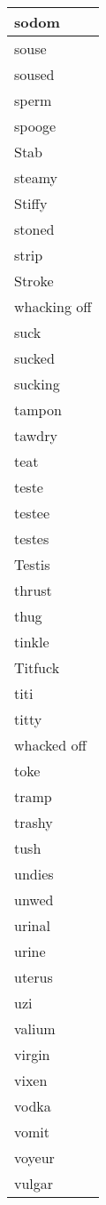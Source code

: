 \begin{longtable}{|l|}
sodom \\ \hline 
souse \\ \hline 
soused \\ \hline 
sperm \\ \hline 
spooge \\ \hline 
Stab \\ \hline 
steamy \\ \hline 
Stiffy \\ \hline 
stoned \\ \hline 
strip \\ \hline 
Stroke \\ \hline 
whacking off \\ \hline 
suck \\ \hline 
sucked \\ \hline 
sucking \\ \hline 
tampon \\ \hline 
tawdry \\ \hline 
teat \\ \hline 
teste \\ \hline 
testee \\ \hline 
testes \\ \hline 
Testis \\ \hline 
thrust \\ \hline 
thug \\ \hline 
tinkle \\ \hline 
Titfuck \\ \hline 
titi \\ \hline 
titty \\ \hline 
whacked off \\ \hline 
toke \\ \hline 
tramp \\ \hline 
trashy \\ \hline 
tush \\ \hline 
undies \\ \hline 
unwed \\ \hline 
urinal \\ \hline 
urine \\ \hline 
uterus \\ \hline 
uzi \\ \hline 
valium \\ \hline 
virgin \\ \hline 
vixen \\ \hline 
vodka \\ \hline 
vomit \\ \hline 
voyeur \\ \hline 
vulgar \\ \hline 

\end{longtable}
